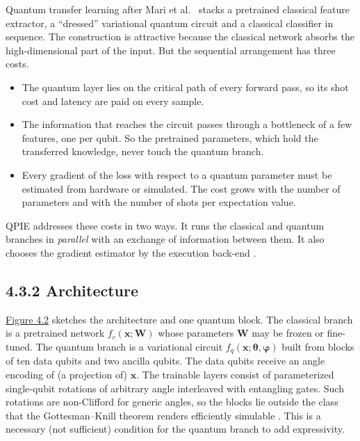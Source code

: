 \documentclass{report}
\theoremstyle{plain}
\theoremstyle{definition}
\theoremstyle{remark}
\begin{document}
Quantum transfer learning after Mari et al.~\cite{mari2020transferlearning} stacks a pretrained classical feature extractor, a ``dressed'' variational quantum circuit and a classical classifier in sequence. The construction is attractive because the classical network absorbs the high-dimensional part of the input. But the sequential arrangement has three costs.
\begin{itemize}
\item The quantum layer lies on the critical path of every forward pass, so its shot cost and latency are paid on every sample.
\item The information that reaches the circuit passes through a bottleneck of a few features, one per qubit. So the pretrained parameters, which hold the transferred knowledge, never touch the quantum branch.
\item Every gradient of the loss with respect to a quantum parameter must be estimated from hardware or simulated. The cost grows with the number of parameters and with the number of shots per expectation value.
\end{itemize}
QPIE addresses these costs in two ways. It runs the classical and quantum branches in \emph{parallel} with an exchange of information between them. It also chooses the gradient estimator by the execution back-end \cite{guo2025qpie}.

\subsection{4.3.2 Architecture}\label{sec:qml:qpie:arch}

\hyperref[fig:qml:qpie]{Figure 4.2} sketches the architecture and one quantum block. The classical branch is a pretrained network $f_c(\bm{x}; \bm{W})$ whose parameters $\bm{W}$ may be frozen or fine-tuned. The quantum branch is a variational circuit $f_q(\bm{x}; \bm{\theta}, \bm{\varphi})$ built from blocks of ten data qubits and two ancilla qubits. The data qubits receive an angle encoding of (a projection of) $\bm{x}$. The trainable layers consist of parameterized single-qubit rotations of arbitrary angle interleaved with entangling gates. Such rotations are non-Clifford for generic angles, so the blocks lie outside the class that the Gottesman--Knill theorem renders efficiently simulable \cite{aaronson2004stabilizer}. This is a necessary (not sufficient) condition for the quantum branch to add expressivity.
\end{document}
